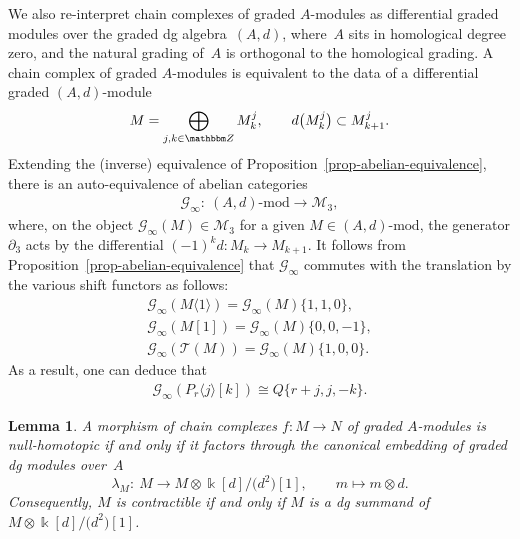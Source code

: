 \documentclass[10pt,a4paper]{amsart}
\newtheorem{lem}[thm]{Lemma}
\theoremstyle{definition}
\numberwithin{equation}{section}
\def\Z{{\mathbbm Z}}
\def\dif{\partial}
\def\lra{{\longrightarrow}}
\def\dmod{{\mathrm{\mbox{-}mod}}} %
\def\mc{\mathcal}
\begin{document}
We also re-interpret chain complexes of graded $A$-modules as differential graded modules over the graded dg algebra~$(A, d)$, where~$A$ sits in homological degree zero, and the natural grading of~$A$ is orthogonal to the homological grading. A chain complex of graded $A$-modules is equivalent to the data of a differential graded $(A,d)$-module
\begin{gather*}M=\bigoplus_{j,k\in \Z}M^j_{k},\qquad d\big(M_{k}^j\big)\subset M_{k+1}^j.\end{gather*}
Extending the (inverse) equivalence of Proposition~\ref{prop-abelian-equivalence}, there is an auto-equivalence of abelian categories
\begin{gather*}%
\mc{G}_\infty\colon \ (A,d)\dmod \lra \mc{M}_3,
\end{gather*}
where, on the object $\mc{G}_\infty(M)\in \mc{M}_3$ for a given $M\in (A,d)\dmod$, the generator $\dif_3$ acts by the differential $(-1)^k d\colon M_{k}\lra M_{k+1}$. It follows from Proposition~\ref{prop-abelian-equivalence} that $\mc{G}_\infty$ commutes with the translation by the various shift functors as follows:
\begin{gather}
 \mc{G}_\infty (M\langle 1 \rangle) = \mc{G}_\infty(M)\{1,1,0\}, \nonumber\\
 \mc{G}_\infty(M[1]) = \mc{G}_\infty (M)\{0,0,-1\}, \nonumber\\
 \mc{G}_\infty (\mc{T}(M)) = \mc{G}_\infty(M)\{1,0,0\}.\label{eqn-G-commute-with-grading-shifts}
\end{gather}
As a result, one can deduce that
\begin{gather}\label{eqn-G-on-Pr}
 \mc{G}_\infty(P_r\langle j \rangle[k])\cong Q\{r+j,j,-k\}.
\end{gather}

\begin{lem}\label{lem-contractible-dg-mod}
A morphism of chain complexes $f\colon M \lra N$ of graded $A$-modules is null-homotopic if and only if it factors through the canonical embedding of graded dg modules over~$A$
\[
\lambda_M \colon \ M\lra M\otimes \Bbbk[d]/\big(d^2\big)[1],\qquad m\mapsto m\otimes d.
\]
Consequently, $M$ is contractible if and only if $M$ is a dg summand of $M\otimes \Bbbk[d]/\big(d^2\big)[1]$.
\end{lem}
\end{document}
